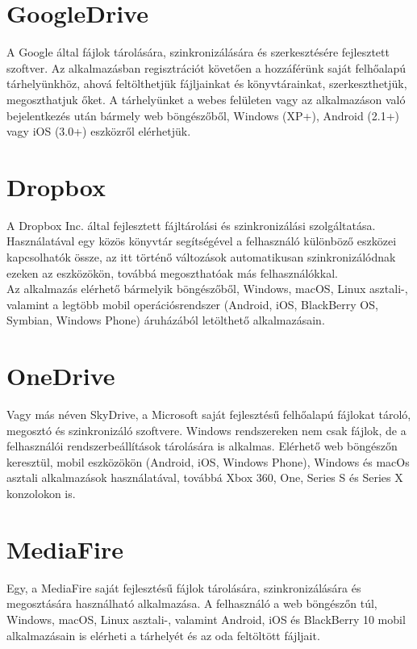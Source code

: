\documentclass[12pt, twoside]{report}
\begin{document}
\section{GoogleDrive}
A Google által fájlok tárolására, szinkronizálására és szerkesztésére fejlesztett szoftver. Az alkalmazásban regisztrációt követően a hozzáférünk saját felhőalapú tárhelyünkhöz, ahová feltölthetjük fájljainkat és könyvtárainkat, szerkeszthetjük, megoszthatjuk őket.
A tárhelyünket a webes felületen vagy az alkalmazáson való bejelentkezés után bármely web böngészőből, Windows (XP+), Android (2.1+) vagy iOS (3.0+) eszközről elérhetjük.

\section{Dropbox}
A Dropbox Inc. által fejlesztett fájltárolási és szinkronizálási szolgáltatása. Használatával egy közös könyvtár segítségével a felhasználó különböző eszközei kapcsolhatók össze, az itt történő változások automatikusan szinkronizálódnak ezeken az eszközökön, továbbá megoszthatóak más felhasználókkal.\\
Az alkalmazás elérhető bármelyik böngészőből, Windows, macOS, Linux asztali-, valamint a legtöbb mobil operációsrendszer (Android, iOS, BlackBerry OS, Symbian, Windows Phone) áruházából letölthető alkalmazásain.

\section{OneDrive}
Vagy más néven SkyDrive, a Microsoft saját fejlesztésű felhőalapú fájlokat tároló, megosztó és szinkronizáló szoftvere. Windows rendszereken nem csak fájlok, de a felhasználói rendszerbeállítások tárolására is alkalmas. Elérhető web böngészőn keresztül, mobil eszközökön (Android, iOS, Windows Phone), Windows és macOs asztali alkalmazások használatával, továbbá Xbox 360, One, Series S és Series X konzolokon is.

\section{MediaFire}
Egy, a MediaFire saját fejlesztésű fájlok tárolására, szinkronizálására és megosztására használható alkalmazása. A felhasználó a web böngészőn túl, Windows, macOS, Linux asztali-, valamint Android, iOS és BlackBerry 10 mobil alkalmazásain is elérheti a tárhelyét és az oda feltöltött fájljait.
\end{document}
